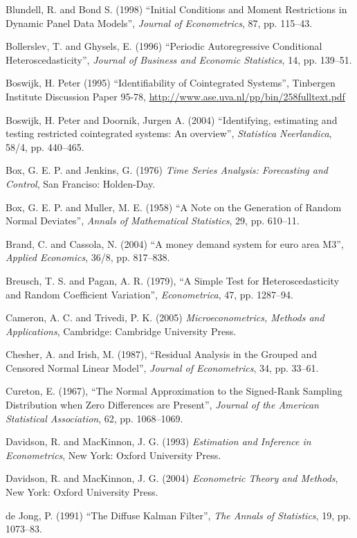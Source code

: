 \begin{thebibliography}
  Blundell, R. and Bond S. (1998) ``Initial Conditions and Moment
  Restrictions in Dynamic Panel Data Models'', \emph{Journal of
    Econometrics}, 87, pp. 115--43.

  Bollerslev, T. and Ghysels, E. (1996) ``Periodic Autoregressive
  Conditional Heteroscedasticity'', \emph{Journal of Business and
    Economic Statistics}, 14, pp. 139--51.

  Boswijk, H. Peter (1995) ``Identifiability of Cointegrated
  Systems'', Tinbergen Institute Discussion Paper 95-78,
  \url{http://www.ase.uva.nl/pp/bin/258fulltext.pdf}

  Boswijk, H. Peter and Doornik, Jurgen A. (2004) ``Identifying,
  estimating and testing restricted cointegrated systems: An
  overview'', \textit{Statistica Neerlandica}, 58/4, pp.
  440--465.

  Box, G. E. P. and Jenkins, G. (1976) \textit{Time Series Analysis:
  Forecasting and Control}, San Franciso: Holden-Day.

  Box, G. E. P. and Muller, M. E.  (1958) ``A Note on the Generation
  of Random Normal Deviates'', \emph{Annals of Mathematical
    Statistics}, 29, pp. 610--11.

  Brand, C. and Cassola, N.  (2004) ``A money demand system for euro
  area M3'', \emph{Applied Economics}, 36/8, pp. 817--838.

  Breusch, T. S. and Pagan, A. R. (1979), ``A Simple Test for
  Heteroscedasticity and Random Coefficient Variation'',
  \emph{Econometrica}, 47, pp. 1287--94.

  Cameron, A. C. and Trivedi, P. K. (2005) \emph{Microeconometrics,
  Methods and Applications}, Cambridge: Cambridge University Press.

  Chesher, A. and Irish, M. (1987), ``Residual Analysis in the Grouped
  and Censored Normal Linear Model'', \emph{Journal of Econometrics},
  34, pp. 33--61.

  Cureton, E. (1967), ``The Normal Approximation to the Signed-Rank
  Sampling Distribution when Zero Differences are Present'',
  \emph{Journal of the American Statistical Association}, 62, pp.
  1068--1069.

  Davidson, R. and MacKinnon, J. G. (1993) \emph{Estimation and
    Inference in Econometrics}, New York: Oxford University Press.

  Davidson, R. and MacKinnon, J. G. (2004) \emph{Econometric Theory
    and Methods}, New York: Oxford University Press.

  de Jong, P. (1991) ``The Diffuse Kalman Filter'', \emph{The Annals
    of Statistics}, 19, pp. 1073--83.


\end{thebibliography}
